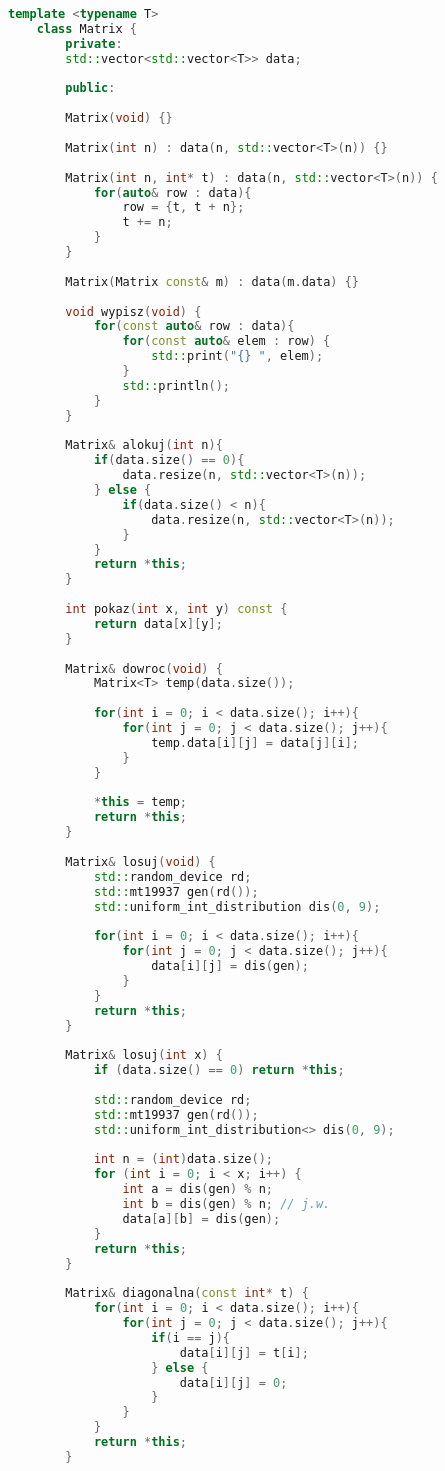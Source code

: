 \begin{lstlisting}[caption=Klasa \texttt{MergeSorter}, label={lst:matrixclass}, language=C++]
	template <typename T>
	class Matrix {
		private:
		std::vector<std::vector<T>> data;
		
		public:
		
		Matrix(void) {}
		
		Matrix(int n) : data(n, std::vector<T>(n)) {}
		
		Matrix(int n, int* t) : data(n, std::vector<T>(n)) {
			for(auto& row : data){
				row = {t, t + n};
				t += n;
			}
		}
		
		Matrix(Matrix const& m) : data(m.data) {}
		
		void wypisz(void) {
			for(const auto& row : data){
				for(const auto& elem : row) {
					std::print("{} ", elem);
				}
				std::println();
			}
		}
		
		Matrix& alokuj(int n){
			if(data.size() == 0){
				data.resize(n, std::vector<T>(n));
			} else {
				if(data.size() < n){
					data.resize(n, std::vector<T>(n));
				}
			}
			return *this;
		}
		
		int pokaz(int x, int y) const {
			return data[x][y];
		}
		
		Matrix& dowroc(void) {
			Matrix<T> temp(data.size());
			
			for(int i = 0; i < data.size(); i++){
				for(int j = 0; j < data.size(); j++){
					temp.data[i][j] = data[j][i];
				}
			}
			
			*this = temp;
			return *this;
		}
		
		Matrix& losuj(void) {
			std::random_device rd;
			std::mt19937 gen(rd());
			std::uniform_int_distribution dis(0, 9);
			
			for(int i = 0; i < data.size(); i++){
				for(int j = 0; j < data.size(); j++){
					data[i][j] = dis(gen);
				}
			}
			return *this;
		}
		
		Matrix& losuj(int x) {
			if (data.size() == 0) return *this;
			
			std::random_device rd;
			std::mt19937 gen(rd());
			std::uniform_int_distribution<> dis(0, 9);
			
			int n = (int)data.size();
			for (int i = 0; i < x; i++) {
				int a = dis(gen) % n;
				int b = dis(gen) % n; // j.w.
				data[a][b] = dis(gen);
			}
			return *this;
		}
		
		Matrix& diagonalna(const int* t) {
			for(int i = 0; i < data.size(); i++){
				for(int j = 0; j < data.size(); j++){
					if(i == j){
						data[i][j] = t[i];
					} else {
						data[i][j] = 0;
					}
				}
			}
			return *this;
		}
		

\end{lstlisting}
